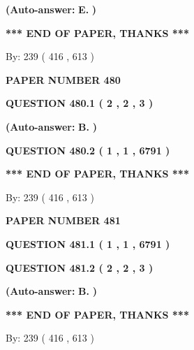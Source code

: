 \documentclass[12pt]{article}
\begin{document}
 
{\textbf{(Auto-answer:}}
{\textbf{\large{
E.}}}
{\textbf{)}}
 
 
   
   
   
   
\vspace{1.0in} 
{\textbf{\large{ *** END OF PAPER, THANKS *** }}} 
   
   
\hspace{1.0in} By: 
 239 ( 416 ,  613 )
   
   
   
   
\newpage 
\setcounter{page}{ 
   480001 } 
   
   
 {\textbf{ \Large{ PAPER NUMBER  480  }}}
   
   
   
   
  
  
{\textbf{\large{QUESTION
480.1 
 ( 2 , 2 , 3 )
}}}
 
 
{\textbf{(Auto-answer:}}
{\textbf{\large{
B.}}}
{\textbf{)}}
 
 
  
  
{\textbf{\large{QUESTION
480.2 
 ( 1 , 1 , 6791 )
}}}
   
   
   
   
\vspace{1.0in} 
{\textbf{\large{ *** END OF PAPER, THANKS *** }}} 
   
   
\hspace{1.0in} By: 
 239 ( 416 ,  613 )
   
   
   
   
\newpage 
\setcounter{page}{ 
   481001 } 
   
   
 {\textbf{ \Large{ PAPER NUMBER  481  }}}
   
   
   
   
  
  
{\textbf{\large{QUESTION
481.1 
 ( 1 , 1 , 6791 )
}}}
  
  
{\textbf{\large{QUESTION
481.2 
 ( 2 , 2 , 3 )
}}}
 
 
{\textbf{(Auto-answer:}}
{\textbf{\large{
B.}}}
{\textbf{)}}
 
 
   
   
   
   
\vspace{1.0in} 
{\textbf{\large{ *** END OF PAPER, THANKS *** }}} 
   
   
\hspace{1.0in} By: 
 239 ( 416 ,  613 )
   
   
   
   
\newpage 
\setcounter{page}{ 
   482001 } 
   
\end{document}
